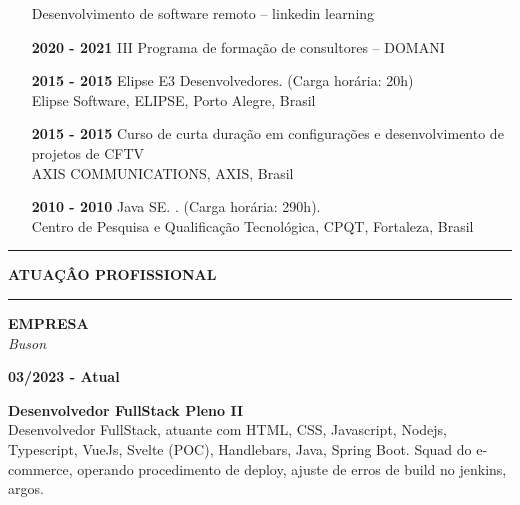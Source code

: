 \documentclass[12pt, a4paper]{article}
\newcommand{\LlinhaG}{2pt} %
\newcommand{\TlinhaG}{17cm}  %
\newcommand{\LlinhaM}{1pt} 	 %
\newcommand{\TlinhaM}{17cm}		 %
\begin{document}
\begin{itemize}
		Desenvolvimento de software remoto – linkedin learning
	\item[\textbf{2020 - 2021}] III Programa de formação de consultores – DOMANI\\
	\item[\textbf{2015 - 2015}] Elipse E3 Desenvolvedores. (Carga horária: 20h)\\
		Elipse Software, ELIPSE, Porto Alegre, Brasil
	\item[\textbf{2015 - 2015}] Curso de curta duração em configurações e desenvolvimento de projetos de CFTV\\
		AXIS COMMUNICATIONS, AXIS, Brasil
	\item[\textbf{2010 - 2010}] Java SE. . (Carga horária: 290h).\\
		Centro de Pesquisa e Qualificação Tecnológica, CPQT, Fortaleza, Brasil
\end{itemize}


\clearpage
\begin{center}	%
	\rule{\TlinhaG}{\LlinhaG}
\end{center}

\begin{center}
	\textbf{ATUAÇÂO PROFISSIONAL}\\
\end{center}

\begin{center} %
	\rule{\TlinhaM}{\LlinhaM}
\end{center}

\begin{multicols}{2}
	\begin{flushleft}
		\textbf{EMPRESA}\\
		\textit{Buson}\\
	\end{flushleft}
	\vfill
	\begin{flushright}
		\textbf{03/2023 - Atual}\\
	\end{flushright}
\end{multicols}
\begin{flushleft}
	\textbf{Desenvolvedor FullStack Pleno II}\\
	Desenvolvedor FullStack, atuante com HTML, CSS, Javascript, Nodejs, Typescript, VueJs, Svelte (POC), Handlebars,
	Java, Spring Boot. Squad  do e-commerce, operando procedimento de deploy, ajuste de erros de build no jenkins, argos.
\end{flushleft}
\end{document}
